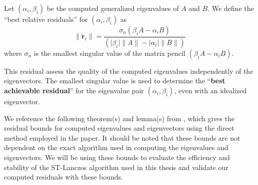 \begin{definition}\label{def:BestResidual}
	Let $(\alpha_i, \beta_i)$ be the computed generalized eigenvalues of $A$ and $B$. We define the ``best relative residuals'' for $(\alpha_i, \beta_i)$ as
	\begin{equation}\label{eq:BestResiduals}
		\|\tilde{\mathbf{r}}_i\| = \frac{\sigma_n(\beta_i A - \alpha_i B)}{(\lvert \beta_i \rvert \|A\| - \lvert \alpha_i \rvert \|B\|)}
	\end{equation}
where $\sigma_n$ is the smallest singular value of the matrix pencil $(\beta_i A - \alpha_i B)$.
\end{definition}
This residual assess the quality of the computed eigenvalues independently of the eigenvectors. The smallest singular value is used to determine the ``\textbf{best achievable residual}'' for the eigenvalue pair $(\alpha_i, \beta_i)$, even with an idealized eigenvector.

We reference the following theorem(s) and lemma(s) from \cite{stewart2024spectraltransformationdensesymmetric}, which gives the residual bounds for computed eigenvalues and eigenvectors using the direct method employed in the paper. It should be noted that these bounds are not dependent on the exact algorithm used in computing the eigenvalues and eigenvectors. We will be using these bounds to evaluate the efficiency and stability of the ST-Lanczos algorithm used in this thesis and validate our computed residuals with these bounds.

